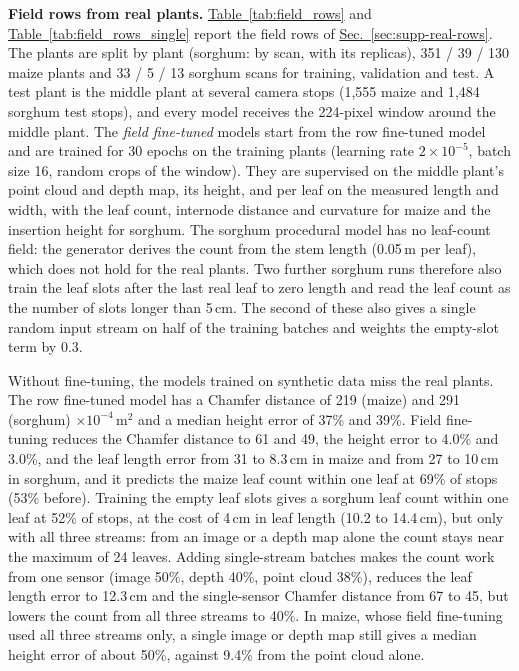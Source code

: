 \documentclass[10pt,twocolumn,letterpaper]{article}
\newcommand{\updtwo}[1]{#1}
\newcommand{\tabref}[1]{\hyperref[#1]{Table~\ref*{#1}}}
\newcommand{\secref}[1]{\hyperref[#1]{Sec.~\ref*{#1}}}
\begin{document}
\updtwo{\noindent\textbf{Field rows from real plants.}
\tabref{tab:field_rows} and \tabref{tab:field_rows_single} report the field rows of \secref{sec:supp-real-rows}. The
plants are split by plant (sorghum: by scan, with its replicas), 351 / 39 / 130 maize plants and 33 / 5 / 13 sorghum
scans for training, validation and test. A test plant is the middle plant at several camera stops (1{,}555 maize and
1{,}484 sorghum test stops), and every model receives the 224-pixel window around the middle plant. The \emph{field
fine-tuned} models start from the row fine-tuned model and are trained for 30 epochs on the training plants (learning
rate $2\times10^{-5}$, batch size 16, random crops of the window). They are supervised on the middle plant's point cloud
and depth map, its height, and per leaf on the measured length and width, with the leaf count, internode distance and
curvature for maize and the insertion height for sorghum. The sorghum procedural model has no leaf-count field: the
generator derives the count from the stem length (0.05\,m per leaf), which does not hold for the real plants. Two further
sorghum runs therefore also train the leaf slots after the last real leaf to zero length and read the leaf count as the
number of slots longer than 5\,cm. The second of these also gives a single random input stream on half of the training
batches and weights the empty-slot term by 0.3.

Without fine-tuning, the models trained on synthetic data miss the real plants. The row fine-tuned model has a Chamfer
distance of 219 (maize) and 291 (sorghum) $\times10^{-4}$\,m$^2$ and a median height error of 37\% and 39\%. Field
fine-tuning reduces the Chamfer distance to 61 and 49, the height error to 4.0\% and 3.0\%, and the leaf length error
from 31 to 8.3\,cm in maize and from 27 to 10\,cm in sorghum, and it predicts the maize leaf count within one leaf at 69\%
of stops (53\% before). Training the empty leaf slots gives a sorghum leaf count within one leaf at 52\% of stops, at the
cost of 4\,cm in leaf length (10.2 to 14.4\,cm), but only with all three streams: from an image or a depth map alone the
count stays near the maximum of 24 leaves. Adding single-stream batches makes the count work from one sensor (image 50\%,
depth 40\%, point cloud 38\%), reduces the leaf length error to 12.3\,cm and the single-sensor Chamfer distance from 67 to
45, but lowers the count from all three streams to 40\%. In maize, whose field fine-tuning used all three streams only, a
single image or depth map still gives a median height error of about 50\%, against 9.4\% from the point cloud alone.}
\end{document}
